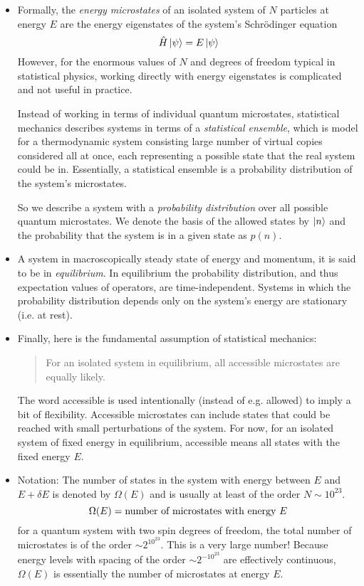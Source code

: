 \documentclass[11pt, a4paper]{article}
\begin{document}
\begin{itemize}
	
	\item Formally, the \textit{energy microstates} of an isolated system of $ N $ particles at energy $ E $ are the energy eigenstates of the system's Schr\"{o}dinger equation 
	\begin{equation*}
		\hat{H}\ket{\psi} = E\ket{\psi}
	\end{equation*}
	However, for the enormous values of $ N $ and degrees of freedom typical in statistical physics, working directly with energy eigenstates is complicated and not useful in practice. 
	
	Instead of working in terms of individual quantum microstates, statistical mechanics describes systems in terms of a \textit{statistical ensemble}, which is model for a thermodynamic system consisting large number of virtual copies considered all at once, each representing a possible state that the real system could be in. Essentially, a statistical ensemble is a probability distribution of the system's microstates.
			
	So we describe a system with a \textit{probability distribution} over all possible quantum microstates.  We denote the basis of the allowed states by $ \ket{n} $ and the probability that the system is in a given state as $ p(n) $.
	
	\item A system in  macroscopically steady state of energy and momentum, it is said to be in \textit{equilibrium}. In equilibrium the probability distribution, and thus expectation values of operators, are time-independent. Systems in which the probability distribution depends only on the system's energy are stationary (i.e. at rest).
	
	\item Finally, here is the fundamental assumption of statistical mechanics:
	\begin{quote}
		For an isolated system in equilibrium, all accessible microstates are equally likely.
	\end{quote}
	The word accessible is used intentionally (instead of e.g. allowed) to imply a bit of flexibility. Accessible microstates can include states that could be reached with small perturbations of the system. For now, for an isolated system of fixed energy in equilibrium, accessible means all states with the fixed energy $ E $.
	
	\item Notation: The number of states in the system with energy between $ E $ and $ E + \delta E $ is denoted by $ \Omega(E) $ and is usually at least of the order $ N \sim 10^{23} $.
	\begin{equation*}
		\Omega(E) = \text{number of microstates with energy $ E $}
	\end{equation*}
	for a quantum system with two spin degrees of freedom, the total number of microstates is of the order $ \sim 2^{10^{23}} $. This is a very large number! Because energy levels with spacing of the order $ \sim 2^{-10^{23}} $ are effectively continuous, $ \Omega(E) $ is essentially the number of microstates at energy $ E $.
	

\end{itemize}
\end{document}

